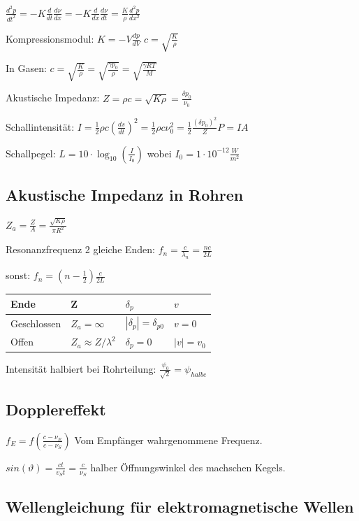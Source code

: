 \documentclass[10pt,a4paper]{scrartcl}
\begin{document}
\begin{multicols*}{3}
	$\frac{d^2p}{dt^2}=-K\frac{d}{dt}\frac{d\nu}{dx}=-K\frac{d}{dx}\frac{d\nu}{dt}=\frac{K}{\rho}\frac{d^2p}{dx^2}$
	
	Kompressionsmodul: $K=-V\frac{dp}{dV}$ \hfill $c=\sqrt{\frac{K}{\rho}}$ 
	
	In Gasen: $c=\sqrt{\frac{K}{\rho}}=\sqrt{\frac{\gamma p_0}{\rho}}=\sqrt{\frac{\gamma RT}{M}}$
	
	Akustische Impedanz: $Z=\rho c=\sqrt{K\rho}=\frac{\delta p_0}{\nu_0}$
	
	Schallintensität: $I=\frac{1}{2}\rho c (\frac{ds}{dt})^2=\frac{1}{2}\rho c \nu_0^2=\frac{1}{2}\frac{(\delta p_0)^2}{Z}$\hfill$P=IA$
	
	Schallpegel: $L=10\cdot\log_{10}(\frac{I}{I_0})$ wobei $I_0 = 1\cdot 10^{-12} \frac{W}{m^2}$
	
	\subsection{Akustische Impedanz in Rohren}
	
	$Z_a=\frac{Z}{A}=\frac{\sqrt{K\rho}}{\pi R^2}$
	
	Resonanzfrequenz 2 gleiche Enden: $f_n=\frac{c}{\lambda_n}=\frac{nc}{2L}$
	
	sonst: $f_n=\left(n-\frac{1}{2}\right)\frac{c}{2L}$
	
	\vspace{1ex}	
	
	\begin{tabular*}{\linewidth}{l|l|l|l}
	\hline
	Ende&Z&$\delta_p$&$v$\\
	\hline
	Geschlossen&$Z_a=\infty$&$|\delta_p|=\delta_{p0}$&$v=0$\\
	Offen&$Z_a\approx Z/\lambda^2$&$\delta_p=0$&$|v|=v_0$\\
	\hline	
	\end{tabular*}
	
	\finn	
	
	Intensität halbiert bei Rohrteilung: $\frac{\psi_0}{\sqrt{2}}=\psi_{halbe}$	
		
	\subsection{Dopplereffekt}
	$f_E=f(\frac{c-\nu_E}{c-\nu_S})$ Vom Empfänger wahrgenommene Frequenz.
	
	$sin(\vartheta)=\frac{ct}{v_St}=\frac{c}{\nu_S}$ halber Öffnungswinkel des machschen Kegels.
	
	\subsection{Wellengleichung für elektromagnetische Wellen}
	

\end{multicols*}
\end{document}
